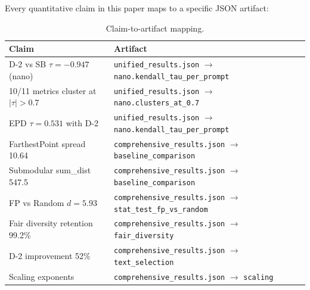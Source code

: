 \documentclass[11pt]{article}
\begin{document}
Every quantitative claim in this paper maps to a specific JSON artifact:

\begin{table}[H]
\centering
\small
\caption{Claim-to-artifact mapping.}
\begin{tabular}{p{6cm}p{5.5cm}}
\toprule
Claim & Artifact \\
\midrule
D-2 vs SB $\tau = -0.947$ (nano) & \texttt{unified\_results.json} $\to$ \texttt{nano.kendall\_tau\_per\_prompt} \\
10/11 metrics cluster at $|\tau|>0.7$ & \texttt{unified\_results.json} $\to$ \texttt{nano.clusters\_at\_0.7} \\
EPD $\tau = 0.531$ with D-2 & \texttt{unified\_results.json} $\to$ \texttt{nano.kendall\_tau\_per\_prompt} \\
FarthestPoint spread 10.64 & \texttt{comprehensive\_results.json} $\to$ \texttt{baseline\_comparison} \\
Submodular sum\_dist 547.5 & \texttt{comprehensive\_results.json} $\to$ \texttt{baseline\_comparison} \\
FP vs Random $d = 5.93$ & \texttt{comprehensive\_results.json} $\to$ \texttt{stat\_test\_fp\_vs\_random} \\
Fair diversity retention 99.2\% & \texttt{comprehensive\_results.json} $\to$ \texttt{fair\_diversity} \\
D-2 improvement 52\% & \texttt{comprehensive\_results.json} $\to$ \texttt{text\_selection} \\
Scaling exponents & \texttt{comprehensive\_results.json} $\to$ \texttt{scaling} \\
\bottomrule
\end{tabular}
\end{table}
\end{document}
